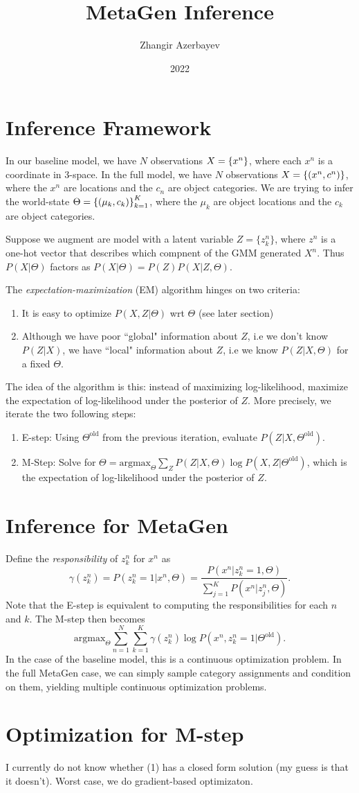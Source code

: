 \documentclass{article}
\title{MetaGen Inference}
\author{Zhangir Azerbayev}
\date{2022}
\begin{document}
\maketitle

\section{Inference Framework}
In our baseline model, we have $N$ observations $X = \left\{x^n\right\}$, where each $x^n$ is a coordinate in 3-space. In the
full model, we have $N$ observations $X = \left\{(x^n, c^n)\right\}$, where the $x^n$ are locations and the $c_n$ are object
categories. We are trying to infer the world-state $\Theta = \left\{(\mu_k, c_k)\right\}_{k=1}^K$, where the $\mu_k$ are object
locations and the $c_k$ are object categories. 

Suppose we augment are model with a latent variable $Z = \{z_k^n\}$, where $z^n$ is a one-hot vector that describes
which compnent of the GMM generated $X^n$. Thus $P(X|\Theta)$ factors as $P(X|\Theta) = P(Z)P(X|Z, \Theta)$. 

The {\it expectation-maximization} (EM) algorithm hinges on two criteria: 
\begin{enumerate}
    \item It is easy to optimize $P(X, Z|\Theta)$ wrt $\Theta$ (see later section)
    \item Although we have poor ``global" information about $Z$, i.e we don't know $P(Z|X)$, we have ``local"
        information about $Z$, i.e we know $P(Z|X, \Theta)$ for a fixed $\Theta$. 
\end{enumerate}
The idea of the algorithm is this: instead of maximizing log-likelihood, maximize the expectation of log-likelihood
under the posterior of $Z$. More precisely, we iterate the two following steps: 
\begin{enumerate}
    \item E-step: Using $\Theta^{\mathrm{old}}$ from the previous iteration, evaluate $P(Z|X, \Theta^{\mathrm{old}})$. 
    \item M-Step: Solve for $\Theta = \mathrm{argmax}_{\Theta} \sum_Z P(Z|X, \Theta)\log P(X, Z|\Theta^{\mathrm{old}})$, which
        is the expectation of log-likelihood under the posterior of $Z$. 
\end{enumerate}
\section{Inference for MetaGen}
Define the {\it responsibility} of $z_k^n$ for $x^n$ as 
\[\gamma(z_k^n) = P(z_k^n=1|x^n, \Theta) = \frac{P(x^n|z_k^n=1, \Theta)}{\sum_{j=1}^KP(x^n|z_j^n, \Theta)}. \]
Note that the E-step is equivalent to computing the responsibilities for each $n$ and $k$. The M-step then becomes 
\begin{equation}\mathrm{argmax}_\Theta\sum_{n=1}^N\sum_{k=1}^K\gamma(z_k^n)\log P(x^n, z_k^n=1| \Theta^{\mathrm{old}}).
\end{equation}
In the case of the baseline model, this is a continuous optimization problem. In the full MetaGen case, we can simply
sample category assignments and condition on them, yielding multiple continuous optimization problems. 

\section{Optimization for M-step}
I currently do not know whether (1) has a closed form solution (my guess is that it doesn't). Worst case, we do
gradient-based optimizaton. 
\end{document}
